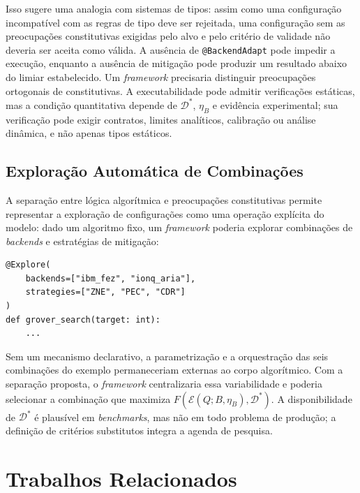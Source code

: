 \documentclass[sigconf]{acmart}
\begin{document}
Isso sugere uma analogia com sistemas de tipos: assim como uma configuração incompatível com as regras de tipo deve ser rejeitada, uma configuração sem as preocupações constitutivas exigidas pelo alvo e pelo critério de validade não deveria ser aceita como válida. A ausência de \texttt{@BackendAdapt} pode impedir a execução, enquanto a ausência de mitigação pode produzir um resultado abaixo do limiar estabelecido. Um \textit{framework} precisaria distinguir preocupações ortogonais de constitutivas. A executabilidade pode admitir verificações estáticas, mas a condição quantitativa depende de $\mathcal{D}^*$, $\eta_B$ e evidência experimental; sua verificação pode exigir contratos, limites analíticos, calibração ou análise dinâmica, e não apenas tipos estáticos.

\subsection{Exploração Automática de Combinações}

A separação entre lógica algorítmica e preocupações constitutivas permite representar a exploração de configurações como uma operação explícita do modelo: dado um algoritmo fixo, um \textit{framework} poderia explorar combinações de \textit{backends} e estratégias de mitigação:

\begin{lstlisting}[float=tbp, caption={Exploração automática de combinações de backend e estratégia de mitigação.}, label={lst:explore}]
@Explore(
    backends=["ibm_fez", "ionq_aria"],
    strategies=["ZNE", "PEC", "CDR"]
)
def grover_search(target: int):
    ...
\end{lstlisting}

Sem um mecanismo declarativo, a parametrização e a orquestração das seis combinações do exemplo permaneceriam externas ao corpo algorítmico. Com a separação proposta, o \textit{framework} centralizaria essa variabilidade e poderia selecionar a combinação que maximiza $F(\mathcal{E}(Q;B,\eta_B),\mathcal{D}^*)$. A disponibilidade de $\mathcal{D}^*$ é plausível em \textit{benchmarks}, mas não em todo problema de produção; a definição de critérios substitutos integra a agenda de pesquisa.

\section{Trabalhos Relacionados}
\label{sec:related}
\end{document}
